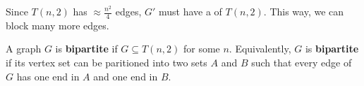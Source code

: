 
\begin{observation}
	Since \( T(n, 2) \) has \( \approx \frac{n^{2}}{4}  \) edges, \( G' \) must have a of \( T(n, 2) \). This way, we can block many more edges.
\end{observation}

\begin{definition}
	A graph \( G \) is \textbf{bipartite} if \( G \subseteq T(n, 2) \) for some \( n \). Equivalently, \( G \) is \textbf{bipartite} if its vertex set can be paritioned into two sets \( A \) and \( B \) such that every edge of \( G \) has one end in \( A \) and one end in \( B \).
\end{definition}
